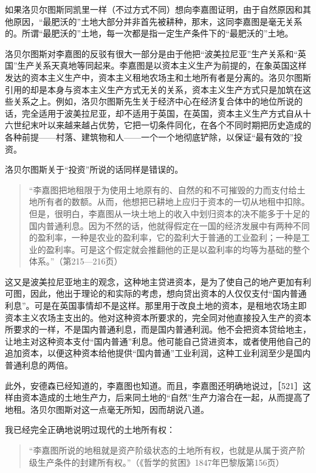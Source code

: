 如果洛贝尔图斯同凯里一样（不过方式不同）想向李嘉图证明，由于自然原因和其他原因，“最肥沃的”土地大部分并非首先被耕种，那末，这同李嘉图是毫无关系的。所谓“最肥沃的”土地，每一次都是指一定生产条件下的“最肥沃的”土地。

洛贝尔图斯对李嘉图的反驳有很大一部分是由于他把“波美拉尼亚”生产关系和“英国”生产关系天真地等同起来。李嘉图是以资本主义生产为前提的，在象英国这样发达的资本主义生产中，资本主义租地农场主和土地所有者是分离的。洛贝尔图斯引用的却是本身与资本主义生产方式无关的关系，资本主义生产方式只是加筑在这些关系之上。例如，洛贝尔图斯先生关于经济中心在经济复合体中的地位所说的话，完全适用于波美拉尼亚，却不适用于英国，在英国，资本主义生产方式自从十六世纪末叶以来越来越占优势，它把一切条件同化，在各个不同时期把历史造成的各种前提——村落、建筑物和人——一个一个地彻底铲除，以保证“最有效的”投资。

洛贝尔图斯关于“投资”所说的话同样是错误的。

\begin{quote}{“李嘉图把地租限于为使用土地原有的、自然的和不可摧毁的力而支付给土地所有者的数额。从而，他想把已耕地上应归于资本的一切从地租中扣除。但是，很明白，李嘉图从一块土地上的收入中划归资本的决不能多于十足的国内普通利息。因为不然的话，他就得假定在一国的经济发展中有两种不同的盈利率，一种是农业的盈利率，它的盈利大于普通的工业盈利；一种是工业的盈利率。可是这个假定就会推翻他的正是以盈利率的均等为基础的整个体系。”（第215—216页）}\end{quote}

这又是波美拉尼亚地主的观念，这种地主贷进资本，是为了使自己的地产更加有利可图，因此，他出于理论的和实际的考虑，想向贷出资本的人仅仅支付“国内普通利息”。可是在英国事情却不是这样。那里用于改良土地的资本，是租地农场主即资本主义农场主支出的。他对这种资本所要求的，完全同对他直接投入生产的资本所要求的一样，不是国内普通利息，而是国内普通利润。他不会把资本贷给地主，让地主对这种资本支付“国内普通”利息。他可能自己贷进资本，或者使用他自己的追加资本，以便这种资本给他提供“国内普通”工业利润，这种工业利润至少是国内普通利息的两倍。

此外，安德森已经知道的，李嘉图也知道。而且，李嘉图还明确地说过，［521］这样由资本造成的土地生产力，后来同土地的“自然”生产力溶合在一起，从而提高了地租。洛贝尔图斯对这一点毫无所知，因而胡说八道。

我已经完全正确地说明过现代的土地所有权：

\begin{quote}{“李嘉图所说的地租就是资产阶级状态的土地所有权，也就是从属于资产阶级生产条件的封建所有权。”（《哲学的贫困》1847年巴黎版第156页）}\end{quote}

